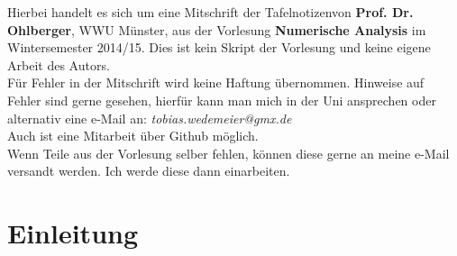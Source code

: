 

\newcommand{\vorlesung}{Numerische Analysis}
\newcommand{\Prof}{Prof. Dr. Ohlberger}
\newcommand{\subt}{Mitschrift der Tafelnotizen}






\maketitle
\thispagestyle{empty}
\cleardoubleoddemptypage

\thispagestyle{empty}
\vspace*{\fill}
\begin{center}
	Hierbei handelt es sich um eine \subt von \textbf{\Prof}, WWU Münster, aus der Vorlesung \textbf{\vorlesung} im Wintersemester 2014/15. 
	Dies ist kein Skript der Vorlesung und keine eigene Arbeit des Autors.\\
	\vspace{2cm}
	Für Fehler in der Mitschrift wird keine Haftung übernommen. 
	Hinweise auf Fehler sind gerne gesehen, hierfür kann man mich in der Uni ansprechen oder alternativ eine e-Mail an: \textit{tobias.wedemeier@gmx.de}\\
	Auch ist eine Mitarbeit über Github möglich.\\
	\vspace{2cm}
	Wenn Teile aus der Vorlesung selber fehlen, können diese gerne an meine e-Mail versandt werden. 
	Ich werde diese dann einarbeiten.\\
\end{center}
\vspace*{\fill}
\cleardoubleoddemptypage


\tableofcontents
\cleardoubleoddemptypage %

\thispagestyle{empty}


\setcounter{section}{-1}

\section{Einleitung}
\label{sec:einleitung}

